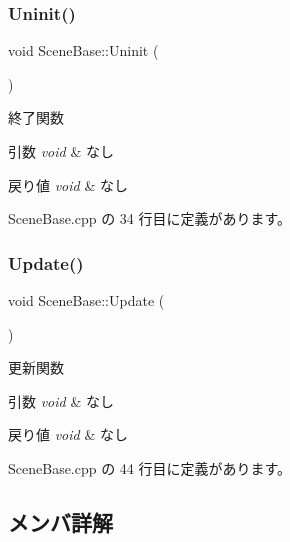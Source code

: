 \subsubsection{\texorpdfstring{Uninit()}{Uninit()}}
{\footnotesize\ttfamily void Scene\+Base\+::\+Uninit (\begin{DoxyParamCaption}{ }\end{DoxyParamCaption})}



終了関数 


\begin{DoxyParams}{引数}
{\em void} & なし \\
\hline
\end{DoxyParams}

\begin{DoxyRetVals}{戻り値}
{\em void} & なし \\
\hline
\end{DoxyRetVals}


 Scene\+Base.\+cpp の 34 行目に定義があります。

\mbox{\label{class_scene_base_a71f332a32d99548b3aa912210a2dd0b0}} 
\subsubsection{\texorpdfstring{Update()}{Update()}}
{\footnotesize\ttfamily void Scene\+Base\+::\+Update (\begin{DoxyParamCaption}{ }\end{DoxyParamCaption})}



更新関数 


\begin{DoxyParams}{引数}
{\em void} & なし \\
\hline
\end{DoxyParams}

\begin{DoxyRetVals}{戻り値}
{\em void} & なし \\
\hline
\end{DoxyRetVals}


 Scene\+Base.\+cpp の 44 行目に定義があります。



\subsection{メンバ詳解}
\mbox{\label{class_scene_base_af9f693449ce2472d28f692bd64d5c2ef}} 
